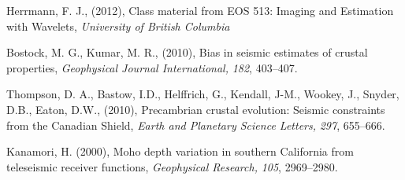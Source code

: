 \documentclass[jgrga]{agutex}
\begin{document}
\begin{article}
%
%
%
%
%
%
%
%
%

\begin{thebibliography}{}

Herrmann, F. J., (2012), Class material from EOS 513: Imaging and Estimation with Wavelets, {\it University of British Columbia}

Bostock, M. G., Kumar, M. R., (2010), Bias in seismic estimates of crustal properties, {\it Geophysical Journal International,} \textit{182}, 403--407.

Thompson, D. A., Bastow, I.D., Helffrich, G., Kendall, J-M., Wookey, J., Snyder, D.B., Eaton, D.W., (2010), Precambrian crustal evolution: Seismic constraints from the Canadian Shield, {\it Earth and Planetary Science Letters,} \textit{297}, 655--666.

Kanamori, H. (2000), Moho depth variation in southern California from teleseismic receiver functions, {\it Geophysical Research,} \textit{105}, 2969--2980.

\end{thebibliography}%



%

%
%

\end{article}
\end{document}
